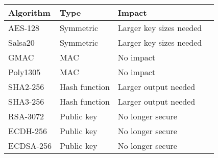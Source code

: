 \begin{tabular}{|l|l|l|l|}
  \hline
  Algorithm & Type          & Impact                  \\ \hline
  AES-128   & Symmetric     & Larger key sizes needed \\
  Salsa20   & Symmetric     & Larger key sizes needed \\
  GMAC      & MAC           & No impact               \\
  Poly1305  & MAC           & No impact               \\
  SHA2-256  & Hash function & Larger output needed    \\
  SHA3-256  & Hash function & Larger output needed    \\
  RSA-3072  & Public key    & No longer secure        \\
  ECDH-256  & Public key    & No longer secure        \\
  ECDSA-256 & Public key    & No longer secure        \\ \hline
\end{tabular}
